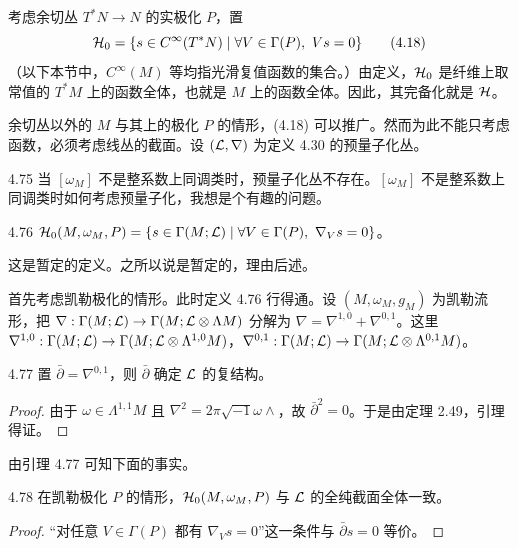 考虑余切丛 $T^*N\to N$ 的实极化 $P$，置
\begin{equation}
  \mathcal{H}_0=\{s\in C^\infty(T^*N)\mid \forall V\in\Gamma(P),\ Vs=0\} \tag{4.18}
\end{equation}
（以下本节中，$C^\infty(M)$ 等均指光滑复值函数的集合。）由定义，$\mathcal{H}_0$ 是纤维上取常值的 $T^*M$ 上的函数全体，也就是 $M$ 上的函数全体。因此，其完备化就是 $\mathcal{H}$。

余切丛以外的 $M$ 与其上的极化 $P$ 的情形，(4.18) 可以推广。然而为此不能只考虑函数，必须考虑线丛的截面。设 $(\mathcal{L},\nabla)$ 为定义 4.30 的预量子化丛。

\begin{remark}{4.75}
  当 $[\omega_M]$ 不是整系数上同调类时，预量子化丛不存在。$[\omega_M]$ 不是整系数上同调类时如何考虑预量子化，我想是个有趣的问题。
\end{remark}

\begin{definition}{4.76}
  $\mathcal{H}_0(M,\omega_M,P)=\{s\in\Gamma(M;\mathcal{L})\mid \forall V\in\Gamma(P),\ \nabla_Vs=0\}$。
\end{definition}

这是暂定的定义。之所以说是暂定的，理由后述。

首先考虑凯勒极化的情形。此时定义 4.76 行得通。设 $(M,\omega_M,g_M)$ 为凯勒流形，把 $\nabla:\Gamma(M;\mathcal{L})\to\Gamma(M;\mathcal{L}\otimes\Lambda M)$ 分解为 $\nabla=\nabla^{1,0}+\nabla^{0,1}$。这里 $\nabla^{1,0}:\Gamma(M;\mathcal{L})\to\Gamma(M;\mathcal{L}\otimes\Lambda^{1,0}M)$，$\nabla^{0,1}:\Gamma(M;\mathcal{L})\to\Gamma(M;\mathcal{L}\otimes\Lambda^{0,1}M)$。

\begin{lemma*}{4.77}
  置 $\bar\partial=\nabla^{0,1}$，则 $\bar\partial$ 确定 $\mathcal{L}$ 的复结构。
\end{lemma*}

\begin{proof}
  由于 $\omega\in\Lambda^{1,1}M$ 且 $\nabla^2=2\pi\sqrt{-1}\omega\wedge$，故 $\bar\partial^2=0$。于是由定理 2.49，引理得证。
\end{proof}

由引理 4.77 可知下面的事实。

\begin{lemma*}{4.78}
  在凯勒极化 $P$ 的情形，$\mathcal{H}_0(M,\omega_M,P)$ 与 $\mathcal{L}$ 的全纯截面全体一致。
\end{lemma*}

\begin{proof}
  “对任意 $V\in\Gamma(P)$ 都有 $\nabla_Vs=0$”这一条件与 $\bar\partial s=0$ 等价。
\end{proof}

